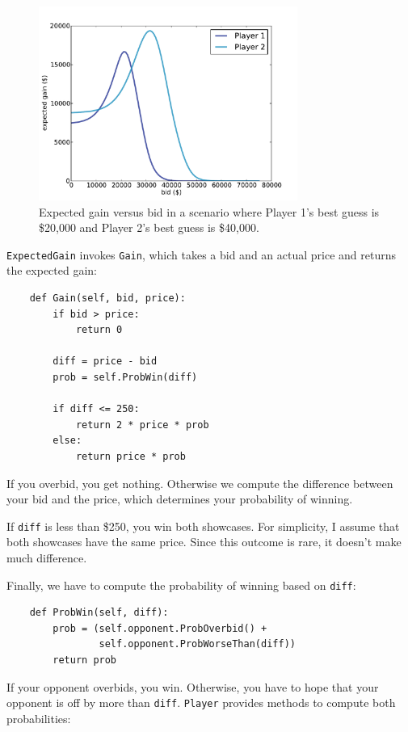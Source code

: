 \documentclass[12pt]{book}
\begin{document}
\begin{figure}
\centerline{\includegraphics[height=2.5in]{figs/price5.pdf}}
\caption{Expected gain versus bid in a scenario where Player 1's best 
guess is \$20,000 and Player 2's best guess is \$40,000.}
\label{fig.price5}
\end{figure}

{\tt ExpectedGain} invokes {\tt Gain}, which takes a bid and an actual
price and returns the expected gain:

\begin{verbatim}
    def Gain(self, bid, price):
        if bid > price:
            return 0

        diff = price - bid
        prob = self.ProbWin(diff)

        if diff <= 250:
            return 2 * price * prob
        else:
            return price * prob
\end{verbatim}

If you overbid, you get nothing.  Otherwise we compute 
the difference between your bid and the price, which determines
your probability of winning.

If {\tt diff} is less than \$250, you win both showcases.  For
simplicity, I assume that both showcases have the same price.  Since
this outcome is rare, it doesn't make much difference.

Finally, we have to compute the probability of winning based
on {\tt diff}:

\begin{verbatim}
    def ProbWin(self, diff):
        prob = (self.opponent.ProbOverbid() + 
                self.opponent.ProbWorseThan(diff))
        return prob
\end{verbatim}

If your opponent overbids, you win.  Otherwise, you have to hope
that your opponent is off by more than {\tt diff}.  {\tt Player}
provides methods to compute both probabilities:
\end{document}
